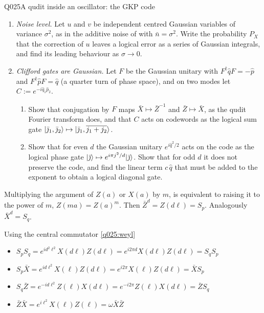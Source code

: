 \begin{entry}{Q025}{A qudit inside an oscillator: the GKP code}
\begin{problem}
\begin{enumerate}[label=\textbf{(\alph*)},leftmargin=*]
  \item \emph{Noise level.} Let $u$ and $v$ be independent centred Gaussian variables of
        variance $\sigma^2$, as in the additive noise of  with $\bar n=\sigma^2$.
        Write the probability $P_X$ that the correction of $u$ leaves a logical error as a
        series of Gaussian integrals, and find its leading behaviour as $\sigma\to0$. 
        
  \item \emph{Clifford gates are Gaussian.} Let $F$ be the Gaussian unitary with
        $F^\dagger\hat qF=-\hat p$ and $F^\dagger\hat pF=\hat q$ (a quarter turn of phase
        space), and on two modes let $C:=e^{-i\hat q_1\hat p_2}$.
        \begin{enumerate}[label=(\roman*)]
          \item Show that conjugation by $F$ maps $\bar X\mapsto\bar Z^{-1}$ and
                $\bar Z\mapsto\bar X$, as the qudit Fourier transform does, and that $C$
                acts on codewords as the logical sum gate
                $\lvert \bar\jmath_1,\bar\jmath_2 \rangle\mapsto\lvert \bar\jmath_1,\overline{j_1+j_2} \rangle$.
          \item Show that for even $d$ the Gaussian unitary $e^{i\hat q^{2}/2}$ acts on
                the code as the logical phase gate $\lvert \bar\jmath \rangle\mapsto
                e^{i\pi j^{2}/d}\lvert \bar\jmath \rangle$. Show that for odd $d$ it does not
                preserve the code, and find the linear term $c\,\hat q$ that must be added
                to the exponent to obtain a logical diagonal gate.
        \end{enumerate}

  
\end{enumerate}
\end{problem}

\begin{solution}[Part (a)]
Multiplying the argument of $Z(a)$ or $X(a)$ by $m$, is equivalent to raising it to the power of $m$, $Z(ma)=Z(a)^m$. Then $\bar Z^{d}=Z(d\ell)=S_p$. Analogously $\bar X^d=S_q$. 

Using the central commutator \eqref{q025:weyl}
\begin{itemize}
    \item  $S_pS_q = e^{id^2\ell^2} X(d\ell)Z(d\ell) = e^{i2\pi d} X(d\ell)Z(d\ell)= S_qS_p$
\item $
    S_p\bar X = e^{id\ell^2} X(\ell)Z(d\ell) = e^{i2\pi } X(\ell)Z(d\ell)= \bar X  S_p$
\item $ S_q\bar Z = e^{-id\ell^2} Z(\ell)X(d\ell) = e^{-i2\pi } Z(\ell)X(d\ell)= \bar Z  S_q $
\item $ \bar Z\bar X = e^{i\ell^2} X(\ell)Z(\ell) = \omega  \bar X \bar Z$
\end{itemize}
    

\end{solution}
\end{entry}
